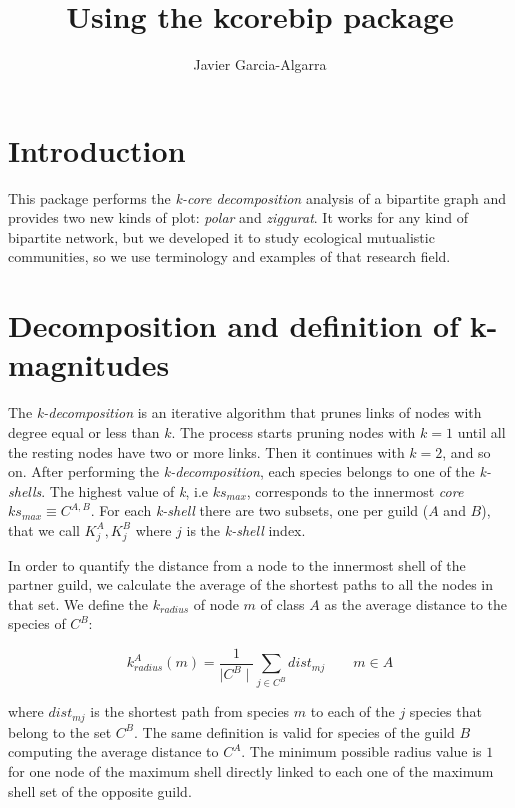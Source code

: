 \documentclass[12pt]{article}
\title{Using the kcorebip package}
\author{Javier Garcia-Algarra}
\begin{document}
\flushbottom
\maketitle

\thispagestyle{empty}

\section*{Introduction}

This package performs the \textit{k-core decomposition} analysis of a bipartite graph and provides two new kinds of plot: \textit{polar} and \textit{ziggurat}. It works for
any kind of bipartite network, but we developed it to study ecological mutualistic communities, so we use terminology and examples of that research field.

\section*{Decomposition and definition of k-magnitudes}
\label{K-magnitudes}

The \textit{k-decomposition} is an iterative algorithm that prunes links of nodes with degree equal or less than $k$. The process starts pruning nodes with $k=1$ until all the resting nodes have two or more links. Then it continues with $k=2$, and so on. After performing the \textit{k-decomposition}, each species belongs to one of the \textit{k-shells}. The highest value of \textit{k}, i.e $ks_{max}$, corresponds to the innermost \textit{core} $ks_{max}\equiv C^{A,B}$. For each \textit{k-shell} there are two subsets, one per guild ($A$ and $B$), that we call $K^{A}_{j}, K^{B}_{j}$ where $j$ is the \textit{k-shell} index.

In order to quantify the distance from a node to the innermost shell of the partner guild, we calculate the average of the shortest paths to all the nodes in that set. We define the \textit{$k_{radius}$} of node $m$ of class $A$ as the average distance to the species of $C^B$:

\begin{equation}
\displaystyle
k^A_{radius}(m) = \frac{1}{\mid C^{B} \mid}\sum\limits_{j \in C^{B}} dist_{mj}  \qquad   m \in A
\label{kradius}
\end{equation}

\noindent where $dist_{mj}$ is the shortest path from species $m$ to each of the $j$ species that belong to the set $C^B$. The same definition is valid for species of the guild $B$ computing the average distance to $C^A$. The minimum possible radius value is $1$ for one node of the maximum shell directly linked to each one of the maximum shell set of the opposite guild.
\end{document}
